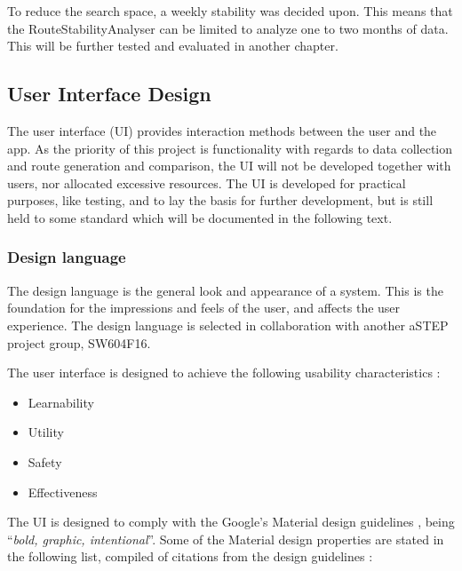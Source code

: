 To reduce the search space, a weekly stability was decided upon. 
This means that the RouteStabilityAnalyser can be limited to analyze one to two months of data.
This will be further tested and evaluated in another chapter. 

\subsection{User Interface Design}
The user interface (UI) provides interaction methods between the user and the app.
As the priority of this project is functionality with regards to data collection and route generation and comparison, the UI will not be developed together with users, nor allocated excessive resources. 
The UI is developed for practical purposes, like testing, and to lay the basis for further development, but is still held to some standard which will be documented in the following text. 

\subsubsection{Design language}
The design language is the general look and appearance of a system.
This is the foundation for the impressions and feels of the user, and affects the user experience.
The design language is selected in collaboration with another aSTEP project group, SW604F16.

The user interface is designed to achieve the following usability characteristics \cite{DIS2014}:
\begin{itemize}
	\item Learnability
	\item Utility
	\item Safety
	\item Effectiveness
\end{itemize}

The UI is designed to comply with the Google's Material design guidelines \cite{materialDesign}, being ``\textit{bold, graphic, intentional}''. 
Some of the Material design properties are stated in the following list, compiled of citations from the design guidelines \cite{materialProperties}:

